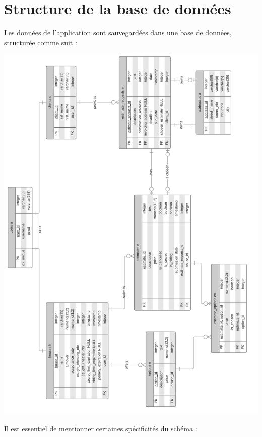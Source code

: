 \documentclass[11pt,a4paper]{report}
\begin{document}
\section{Structure de la base de données}
\begin{flushleft}
Les données de l’application sont sauvegardées dans une base de données, structurée comme suit :
\begin{center}
  \includegraphics[scale=0.65]{dsd.png}
\end{center}
\end{flushleft}

\newpage
Il est essentiel de mentionner certaines spécificités du schéma :
\end{document}
